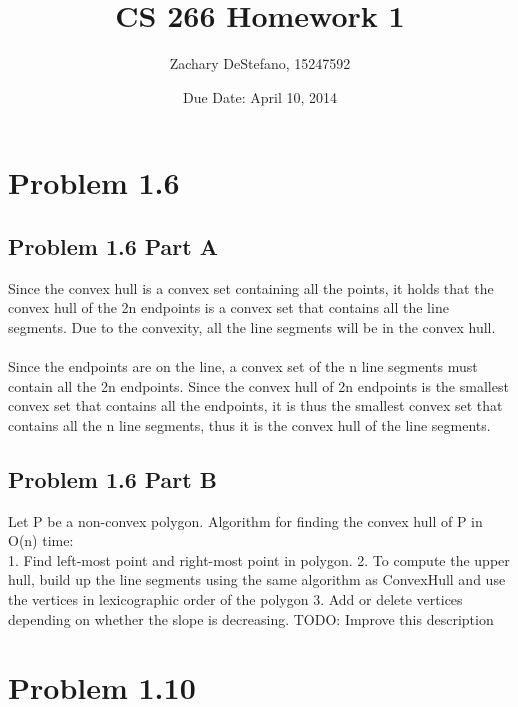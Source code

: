 \documentclass[11pt,psfig]{article}
\begin{document}
\setlength{\parskip}{1.2ex plus0.3ex minus 0.3ex}


\thispagestyle{empty} \pagestyle{myheadings} 



\title{CS 266 Homework 1}
\author{Zachary DeStefano, 15247592}
\date{Due Date: April 10, 2014}

\maketitle

\vfill\eject

\section*{Problem 1.6}

\subsection*{Problem 1.6 Part A}

Since the convex hull is a convex set containing all the points, it holds that the convex hull of the 2n endpoints is a convex set that contains all the line segments. Due to the convexity, all the line segments will be in the convex hull. 
\\
\\
Since the endpoints are on the line, a convex set of the n line segments must contain all the 2n endpoints. Since the convex hull of 2n endpoints is the smallest convex set that contains all the endpoints, it is thus the smallest convex set that contains all the n line segments, thus it is the convex hull of the line segments. 

\subsection*{Problem 1.6 Part B}

Let P be a non-convex polygon. Algorithm for finding the convex hull of P in O(n) time:
\\
1. Find left-most point and right-most point in polygon. 
2. To compute the upper hull, build up the line segments using the same algorithm as ConvexHull and use the vertices in lexicographic order of the polygon
3. Add or delete vertices depending on whether the slope is decreasing. 
TODO: Improve this description

\section*{Problem 1.10}
\end{document}
